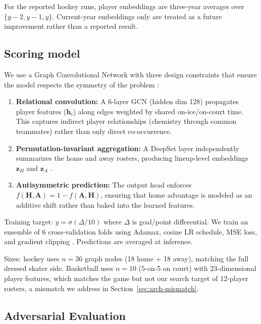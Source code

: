 \documentclass[11pt,letterpaper]{article}
\begin{document}
For the reported hockey runs, player embeddings are three-year averages
over $\{y-2, y-1, y\}$. Current-year embeddings only are treated as a
future improvement rather than a reported result.

\subsection{Scoring model}

We use a Graph Convolutional Network with three design constraints that
ensure the model respects the symmetry of the problem
\cite{kipf2017gcn}:

\begin{enumerate}[leftmargin=*]
  \item \textbf{Relational convolution:} A 6-layer GCN (hidden dim 128)
    propagates player features ($\mathbf{h}_i$) along edges weighted by
    shared on-ice/on-court time. This captures indirect player
    relationships (chemistry through common teammates) rather than only
    direct co-occurrence.
  \item \textbf{Permutation-invariant aggregation:} A DeepSet layer
    independently summarizes the home and away rosters, producing
    lineup-level embeddings $\mathbf{z}_H$ and $\mathbf{z}_A$
    \cite{zaheer2017deepsets}.
  \item \textbf{Antisymmetric prediction:} The output head enforces
    $f(\mathbf{H}, \mathbf{A}) = 1 - f(\mathbf{A}, \mathbf{H})$,
    ensuring that home advantage is modeled as an additive shift rather
    than baked into the learned features.
\end{enumerate}

Training target: $y = \sigma(\Delta / 10)$ where $\Delta$ is goal/point
differential. We train an ensemble of 6 cross-validation folds using
Adamax, cosine LR schedule, MSE loss, and gradient clipping
\cite{kingma2015adam,loshchilov2017sgdr}. Predictions are averaged at
inference.

Sizes: hockey uses $n = 36$ graph nodes (18 home + 18 away), matching
the full dressed skater side. Basketball uses $n = 10$ (5-on-5 on
court) with $23$-dimensional player features, which matches the game
but not our search target of 12-player rosters, a mismatch we address
in Section~\ref{sec:arch-mismatch}.

\subsection{Adversarial Evaluation}
\end{document}
